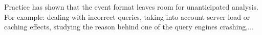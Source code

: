 Practice has shown that the event format leaves room for unanticipated analysis. For example: dealing with incorrect queries, taking into account server load or caching effects, studying the reason behind one of the query engines crashing,...


